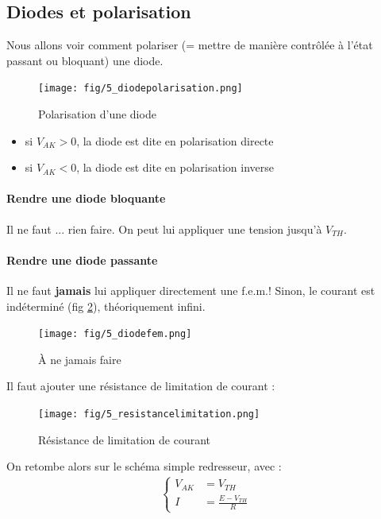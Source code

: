 \documentclass[a4paper]{article}
\begin{document}
    \subsection{Diodes et polarisation}
    Nous allons voir comment polariser (= mettre de manière contrôlée à l'état passant ou bloquant) une diode.

    \begin{figure}[H]
        \begin{center}
            \texttt{[image: fig/5\_diodepolarisation.png]}
            \caption{Polarisation d'une diode}
            \label{fig:5_diodepolarisation}
        \end{center}
    \end{figure}
    \begin{itemize}
        \item si $V_{AK} > 0$, la diode est dite en polarisation directe
        \item si $V_{AK} < 0$, la diode est dite en polarisation inverse
    \end{itemize}

    \paragraph{Rendre une diode bloquante}
    Il ne faut ... rien faire. On peut lui appliquer une tension jusqu'à $V_{TH}$.

    \paragraph{Rendre une diode passante}
    Il ne faut \textbf{jamais} lui appliquer directement une f.e.m.! Sinon, 
    le courant est indéterminé (fig \ref{fig:5_diodefem}), théoriquement infini.
    \begin{figure}[H]
        \begin{center}
            \texttt{[image: fig/5\_diodefem.png]}
            \caption{\`A ne jamais faire}
            \label{fig:5_diodefem}
        \end{center}
    \end{figure}

    Il faut ajouter une résistance de limitation de courant :
    \begin{figure}[H]
        \begin{center}
            \texttt{[image: fig/5\_resistancelimitation.png]}
            \caption{Résistance de limitation de courant}
            \label{fig:5_resistancelimitation}
        \end{center}
    \end{figure}
    On retombe alors sur le schéma simple redresseur, avec :
    \begin{align*}
        \begin{cases}
            V_{AK} &= V_{TH}\\
            I &=\frac{E-V_{TH}}{R}
        \end{cases}
    \end{align*}
\end{document}
